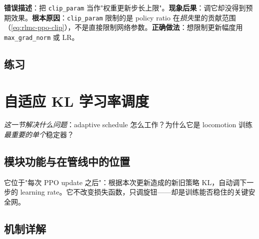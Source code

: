 \begin{pitfall}
\textbf{错误描述}：把 \verb|clip_param| 当作"权重更新步长上限"。\textbf{现象后果}：调它却没得到预期效果。\textbf{根本原因}：\verb|clip_param| 限制的是 policy ratio 在\emph{损失}里的贡献范围（\cref{eq:rlmc-ppo-clip}），不是直接限制网络参数。\textbf{正确做法}：想限制更新幅度用 \verb|max_grad_norm| 或 LR。
\end{pitfall}

\subsection{练习}

\begin{practice}[超参诊断]
\end{practice}

\section{自适应 KL 学习率调度}
\label{sec:rlmc-train-adaptkl}

\emph{这一节解决什么问题}：adaptive schedule 怎么工作？为什么它是 locomotion 训练\emph{最重要的单个}稳定器？

\subsection{模块功能与在管线中的位置}

它位于"每次 PPO update 之后"：根据本次更新造成的新旧策略 KL，自动调下一步的 learning rate。它不改变损失函数，只调旋钮——却是训练能否稳住的关键安全网。

\subsection{机制详解}

